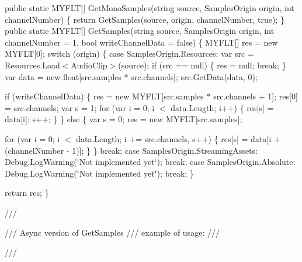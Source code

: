 public static MYFLT\mbox{[}\mbox{]} Get\+Mono\+Samples(string source, Samples\+Origin origin, int channel\+Number) \{ return Get\+Samples(source, origin, channel\+Number, true); \} public static MYFLT\mbox{[}\mbox{]} Get\+Samples(string source, Samples\+Origin origin, int channel\+Number = 1, bool write\+Channel\+Data = false) \{ MYFLT\mbox{[}\mbox{]} res = new MYFLT\mbox{[}0\mbox{]}; switch (origin) \{ case Samples\+Origin.\+Resources\+: var src = Resources.\+Load$<$\+Audio\+Clip$>$(source); if (src == null) \{ res = null; break; \} var data = new float\mbox{[}src.\+samples $\ast$ src.\+channels\mbox{]}; src.\+Get\+Data(data, 0);

if (write\+Channel\+Data) \{ res = new MYFLT\mbox{[}src.\+samples $\ast$ src.\+channels + 1\mbox{]}; res\mbox{[}0\mbox{]} = src.\+channels; var s = 1; for (var i = 0; i \texorpdfstring{$<$}{<} data.\+Length; i++) \{ res\mbox{[}s\mbox{]} = data\mbox{[}i\mbox{]}; s++; \} \} else \{ var s = 0; res = new MYFLT\mbox{[}src.\+samples\mbox{]};

for (var i = 0; i \texorpdfstring{$<$}{<} data.\+Length; i += src.\+channels, s++) \{ res\mbox{[}s\mbox{]} = data\mbox{[}i + (channel\+Number -\/ 1)\mbox{]}; \} \} break; case Samples\+Origin.\+Streaming\+Assets\+: Debug.\+Log\+Warning(\char`\"{}\+Not implemented yet\char`\"{}); break; case Samples\+Origin.\+Absolute\+: Debug.\+Log\+Warning(\char`\"{}\+Not implemented yet\char`\"{}); break; \}

return res; \}

/// 

/// Async version of Get\+Samples /// example of usage\+: /// 
\begin{DoxyCode}{0}
\DoxyCodeLine{/// \{}
\DoxyCodeLine{/// \});}
\DoxyCodeLine{/// }

\end{DoxyCode}
 /// 

